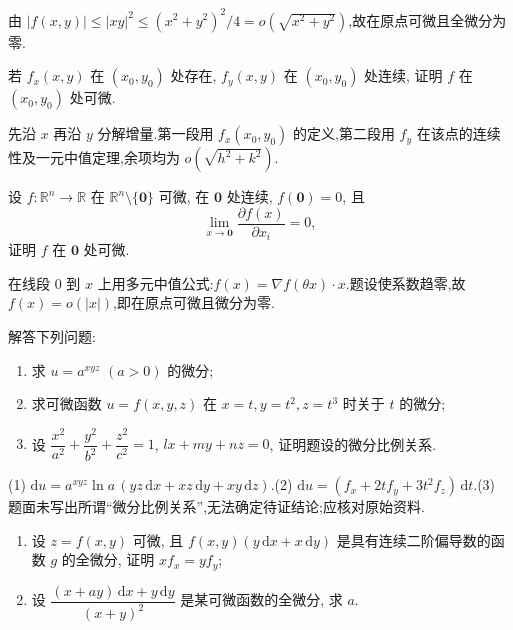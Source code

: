 \begin{solution}
    由 $|f(x,y)|\leq|xy|^2\leq(x^2+y^2)^2/4=o(\sqrt{x^2+y^2})$,故在原点可微且全微分为零.
\end{solution}

\begin{example}
    若 $f_x(x,y)$ 在 $(x_0,y_0)$ 处存在, $f_y(x,y)$ 在 $(x_0,y_0)$ 处连续, 证明 $f$ 在 $(x_0,y_0)$ 处可微.
\end{example}
\exampleblank

\begin{solution}
    先沿 $x$ 再沿 $y$ 分解增量.第一段用 $f_x(x_0,y_0)$ 的定义,第二段用 $f_y$ 在该点的连续性及一元中值定理,余项均为 $o(\sqrt{h^2+k^2})$.
\end{solution}

\begin{example}
    设 $f:\mathbb{R}^n\to\mathbb{R}$ 在 $\mathbb{R}^n\setminus\{\bm{0}\}$ 可微, 在 $\bm{0}$ 处连续, $f(\bm{0})=0$, 且
    \[
        \lim\limits_{x\to\bm{0}}\dfrac{\partial f(x)}{\partial x_i}=0,
    \]
    证明 $f$ 在 $\bm{0}$ 处可微.
\end{example}
\exampleblank

\begin{solution}
    在线段 $0$ 到 $x$ 上用多元中值公式:$f(x)=\nabla f(\theta x)\cdot x$.题设使系数趋零,故 $f(x)=o(|x|)$,即在原点可微且微分为零.
\end{solution}

\begin{example}
    解答下列问题:
    \begin{enumerate}
        \item 求 $u=a^{xyz}$ $(a>0)$ 的微分;
        \item 求可微函数 $u=f(x,y,z)$ 在 $x=t,y=t^2,z=t^3$ 时关于 $t$ 的微分;
        \item 设 $\dfrac{x^2}{a^2}+\dfrac{y^2}{b^2}+\dfrac{z^2}{c^2}=1$, $lx+my+nz=0$, 证明题设的微分比例关系.
    \end{enumerate}
\end{example}
\exampleblank

\begin{solution}
    (1) $\mathrm du=a^{xyz}\ln a\,(yz\,\mathrm dx+xz\,\mathrm dy+xy\,\mathrm dz)$.(2) $\mathrm du=(f_x+2tf_y+3t^2f_z)\,\mathrm dt$.(3) 题面未写出所谓“微分比例关系”,无法确定待证结论;应核对原始资料.
\end{solution}

\begin{example}
    \begin{enumerate}
        \item 设 $z=f(x,y)$ 可微, 且 $f(x,y)(y\,\mathrm{d}x+x\,\mathrm{d}y)$ 是具有连续二阶偏导数的函数 $g$ 的全微分, 证明 $xf_x=yf_y$;
        \item 设 $\displaystyle\dfrac{(x+ay)\,\mathrm{d}x+y\,\mathrm{d}y}{(x+y)^2}$ 是某可微函数的全微分, 求 $a$.
    \end{enumerate}
\end{example}
\exampleblank


